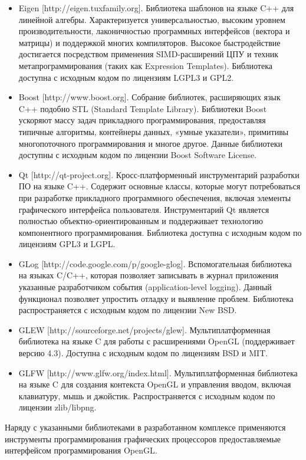 \begin{itemize}
    \item Eigen [http://eigen.tuxfamily.org]. Библиотека шаблонов на языке C++ для линейной алгебры. Характеризуется универсальностью, высоким уровнем производительности, лаконичностью программных интерфейсов (вектора и матрицы) и поддержкой многих компиляторов. Высокое быстродействие достигается посредством применения SIMD-расширений ЦПУ и техник метапрограммирования (таких как Expression Templates). Библиотека доступна с исходным кодом по лицензиям LGPL3 и GPL2.
    \item Boost [http://www.boost.org]. Собрание библиотек, расширяющих язык C++ подобно STL (Standard Template Library). Библиотеки Boost ускоряют массу задач прикладного программирования, предоставляя типичные алгоритмы, контейнеры данных, «умные указатели», примитивы многопоточного программирования и многое другое. Данные библиотеки доступны с исходным кодом по лицензии Boost Software License.
    \item Qt [http://qt-project.org]. Кросс-платформенный инструментарий разработки ПО на языке C++. Содержит основные классы, которые могут потребоваться при разработке прикладного программного обеспечения, включая элементы графического интерфейса пользователя. Инструментарий Qt является полностью объектно-ориентированным и поддерживает технологию компонентного программирования. Библиотека доступна с исходным кодом по лицензиям GPL3 и LGPL.
    \item GLog [http://code.google.com/p/google-glog]. Вспомогательная библиотека на языках C/C++, которая позволяет записывать в журнал приложения указанные разработчиком события (application-level logging). Данный функционал позволяет упростить отладку и выявление проблем. Библиотека распространяется с исходным кодом по лицензии New BSD.
    \item GLEW [http://sourceforge.net/projects/glew]. Мультиплатформенная библиотека на языке C для работы с расширениями OpenGL (поддерживает версию 4.3). Доступна с исходным кодом по лицензиям BSD и MIT.
    \item GLFW [http://www.glfw.org/index.html]. Мультиплатформенная библиотека на языке C для создания контекста OpenGL и управления вводом, включая клавиатуру, мышь и джойстик. Распространяется с исходным кодом по лицензии zlib/libpng.
\end{itemize}

Наряду с указанными библиотеками в разработанном комплексе применяются инструменты программирования графических процессоров предоставляемые интерфейсом программирования OpenGL.

